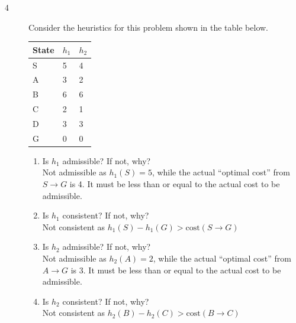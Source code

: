 \documentclass[11pt]{article}
\begin{document}
  \begin{description}

\clearpage

  \item[4] Consider the heuristics for this problem shown in the table below.

     \begin{center}
     \begin{tabular}{|l|l|l|}\hline
     State & $h_1$ & $h_2$ \\ \hline
     S     & 5     & 4     \\ \hline
     A     & 3     & 2     \\ \hline
     B     & 6     & 6     \\ \hline
     C     & 2     & 1     \\ \hline
     D     & 3     & 3     \\ \hline
     G     & 0     & 0     \\ \hline
     \end{tabular}
     \end{center}

     \begin{enumerate}

     \item Is $h_1$ admissible?  If not, why? \\

       Not admissible as $h_{1}(S) = 5$, while the actual ``optimal cost'' from $S \rightarrow G$ is 4. It must be less than or equal to the actual cost to be admissible.

     \item Is $h_1$ consistent?  If not, why? \\

       Not consistent as $h_{1}(S) - h_{1}(G) > \text{cost}(S \rightarrow G)$

     \item Is $h_2$ admissible?  If not, why? \\

       Not admissible as $h_{2}(A) = 2$, while the actual ``optimal cost'' from $A \rightarrow G$ is 3. It must be less than or equal to the actual cost to be admissible.

     \item Is $h_2$ consistent?  If not, why? \\

       Not consistent as $h_{2}(B) - h_{2}(C) > \text{cost}(B \rightarrow C)$

     \end{enumerate}

  \end{description}
\end{document}
